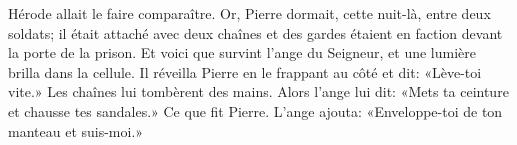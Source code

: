 Hérode allait le faire comparaître.
Or, Pierre dormait, cette nuit-là, entre deux soldats;
	il était attaché avec deux chaînes
	et des gardes étaient en faction devant la porte de la prison.
Et voici que survint l’ange du Seigneur, et une lumière brilla dans la cellule.
Il réveilla Pierre en le frappant au côté et dit: «Lève-toi vite.»
	Les chaînes lui tombèrent des mains.
Alors l’ange lui dit: «Mets ta ceinture et chausse tes sandales.»
	Ce que fit Pierre.
L’ange ajouta: «Enveloppe-toi de ton manteau et suis-moi.»
